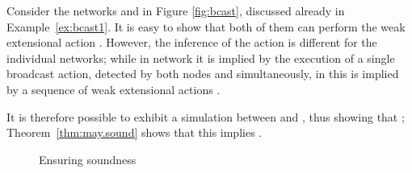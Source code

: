 \documentclass{LMCS}
\begin{document}
\begin{exa}
\label{ex:bcast}
Consider the networks  and  in Figure \ref{fig:bcast},
discussed already in Example~\ref{ex:bcast1}.  It is easy to show that
both of them can perform the weak extensional action
. However, the inference of the
action is different for the individual networks; while in network
 it is implied by the execution of a single broadcast action,
detected by both nodes  and  simultaneously, in  this
is implied by a sequence of weak extensional actions .

It is therefore possible to exhibit a simulation between  and
, thus showing that ; 
Theorem~\ref{thm:may.sound} shows that this implies
.
\end{exa}

\begin{figure}[t]
                                 


 \caption{Ensuring soundness}
  \label{fig:counterex2}
\end{figure}
\end{document}

